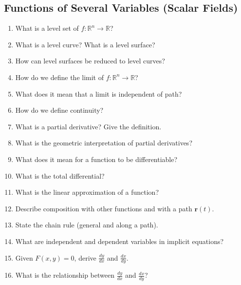 \subsection*{Functions of Several Variables (Scalar Fields)}

\begin{enumerate}

\item What is a level set of $f:\mathbb{R}^n \to \mathbb{R}$?

\item What is a level curve? What is a level surface?

\item How can level surfaces be reduced to level curves?

\item How do we define the limit of $f:\mathbb{R}^n \to \mathbb{R}$?

\item What does it mean that a limit is independent of path?

\item How do we define continuity?

\item What is a partial derivative? Give the definition.

\item What is the geometric interpretation of partial derivatives?

\item What does it mean for a function to be differentiable?

\item What is the total differential?

\item What is the linear approximation of a function?

\item Describe composition with other functions and with a path $\mathbf{r}(t)$.

\item State the chain rule (general and along a path).

\item What are independent and dependent variables in implicit equations?

\item Given $F(x,y)=0$, derive $\frac{dy}{dx}$ and $\frac{dx}{dy}$.

\item What is the relationship between $\frac{dy}{dx}$ and $\frac{dx}{dy}$?

\end{enumerate}

